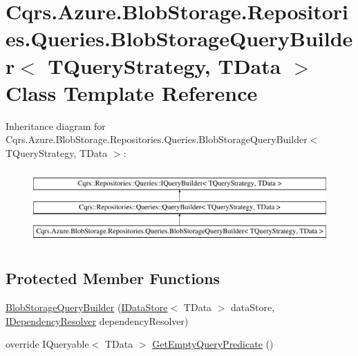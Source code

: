 \hypertarget{classCqrs_1_1Azure_1_1BlobStorage_1_1Repositories_1_1Queries_1_1BlobStorageQueryBuilder}{}\section{Cqrs.\+Azure.\+Blob\+Storage.\+Repositories.\+Queries.\+Blob\+Storage\+Query\+Builder$<$ T\+Query\+Strategy, T\+Data $>$ Class Template Reference}
\label{classCqrs_1_1Azure_1_1BlobStorage_1_1Repositories_1_1Queries_1_1BlobStorageQueryBuilder}
Inheritance diagram for Cqrs.\+Azure.\+Blob\+Storage.\+Repositories.\+Queries.\+Blob\+Storage\+Query\+Builder$<$ T\+Query\+Strategy, T\+Data $>$\+:\begin{figure}[H]
\begin{center}
\leavevmode
\includegraphics[height=2.876712cm]{classCqrs_1_1Azure_1_1BlobStorage_1_1Repositories_1_1Queries_1_1BlobStorageQueryBuilder}
\end{center}
\end{figure}
\subsection*{Protected Member Functions}
\begin{DoxyCompactItemize}
\item 
\hyperlink{classCqrs_1_1Azure_1_1BlobStorage_1_1Repositories_1_1Queries_1_1BlobStorageQueryBuilder_ae6519f289d2b7be9d322dfa7171dea8b}{Blob\+Storage\+Query\+Builder} (\hyperlink{interfaceCqrs_1_1DataStores_1_1IDataStore}{I\+Data\+Store}$<$ T\+Data $>$ data\+Store, \hyperlink{interfaceCqrs_1_1Configuration_1_1IDependencyResolver}{I\+Dependency\+Resolver} dependency\+Resolver)
\item 
override I\+Queryable$<$ T\+Data $>$ \hyperlink{classCqrs_1_1Azure_1_1BlobStorage_1_1Repositories_1_1Queries_1_1BlobStorageQueryBuilder_a5987844de032c5473714dafcee7f4ae1}{Get\+Empty\+Query\+Predicate} ()
\end{DoxyCompactItemize}

